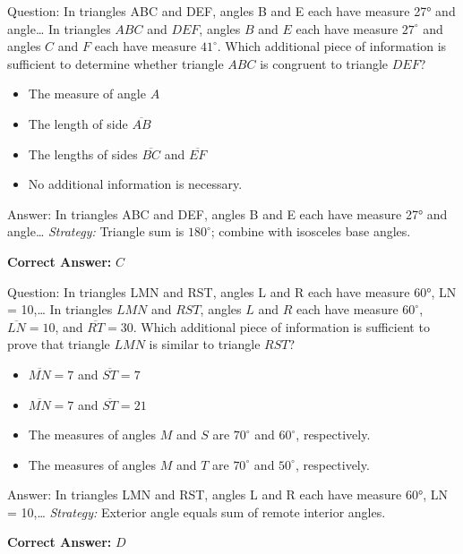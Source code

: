 \documentclass{beamer}
\begin{document}
\begin{frame}{Question: In triangles ABC and DEF, angles B and E each have measure 27° and angle…}
In triangles $ABC$ and $DEF$, angles $B$ and $E$ each have measure $27^\circ$ and angles $C$ and $F$ each have measure $41^\circ$.  
Which additional piece of information is sufficient to determine whether triangle $ABC$ is congruent to triangle $DEF$?
\begin{itemize}
    \item[\textbf{A.}] The measure of angle $A$
    \item[\textbf{B.}] The length of side $\overline{AB}$
    \item[\textbf{C.}] The lengths of sides $\overline{BC}$ and $\overline{EF}$
    \item[\textbf{D.}] No additional information is necessary.
\end{itemize}
\end{frame}
\begin{frame}{Answer: In triangles ABC and DEF, angles B and E each have measure 27° and angle…}
\textit{Strategy:} Triangle sum is $180^\circ$; combine with isosceles base angles.

\textbf{Correct Answer:} \( \boxed{C} \)

\end{frame}
\begin{frame}{Question: In triangles LMN and RST, angles L and R each have measure 60°, LN = 10,…}
In triangles $LMN$ and $RST$, angles $L$ and $R$ each have measure $60^\circ$, $\overline{LN} = 10$, and $\overline{RT} = 30$.  
Which additional piece of information is sufficient to prove that triangle $LMN$ is similar to triangle $RST$?
\begin{itemize}
    \item[\textbf{A.}] $\overline{MN} = 7$ and $\overline{ST} = 7$
    \item[\textbf{B.}] $\overline{MN} = 7$ and $\overline{ST} = 21$
    \item[\textbf{C.}] The measures of angles $M$ and $S$ are $70^\circ$ and $60^\circ$, respectively.
    \item[\textbf{D.}] The measures of angles $M$ and $T$ are $70^\circ$ and $50^\circ$, respectively.
\end{itemize}
\end{frame}
\begin{frame}{Answer: In triangles LMN and RST, angles L and R each have measure 60°, LN = 10,…}
\textit{Strategy:} Exterior angle equals sum of remote interior angles.

\textbf{Correct Answer:} \( \boxed{D} \)

\end{frame}
\end{document}
